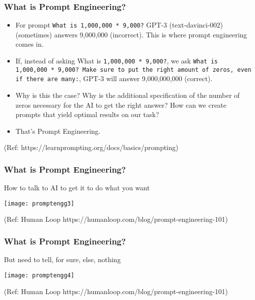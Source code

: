\begin{frame}[fragile]\frametitle{What is Prompt Engineering?}

\begin{itemize}
\item For prompt \lstinline|What is 1,000,000 * 9,000?| GPT-3 (text-davinci-002) (sometimes) answers 9,000,000 (incorrect). This is where prompt engineering comes in.
\item If, instead of asking What is \lstinline|1,000,000 * 9,000?|, we ask \lstinline|What is 1,000,000 * 9,000? Make sure to put the right amount of zeros, even if there are many:|, GPT-3 will answer 9,000,000,000 (correct). 
\item Why is this the case? Why is the additional specification of the number of zeros necessary for the AI to get the right answer? How can we create prompts that yield optimal results on our task? 			
\item That's Prompt Engineering.
\end{itemize}

{\tiny (Ref: https://learnprompting.org/docs/basics/prompting)}
\end{frame}

\begin{frame}[fragile]\frametitle{What is Prompt Engineering?}

How to talk to AI to get it to do what you want


\begin{center}
\texttt{[image: promptengg3]}

{\tiny (Ref: Human Loop https://humanloop.com/blog/prompt-engineering-101)}

\end{center}				
			
			

\end{frame}

\begin{frame}[fragile]\frametitle{What is Prompt Engineering?}

But need to tell, for sure, else, nothing


\begin{center}
\texttt{[image: promptengg4]}

{\tiny (Ref: Human Loop https://humanloop.com/blog/prompt-engineering-101)}

\end{center}				

\end{frame}



